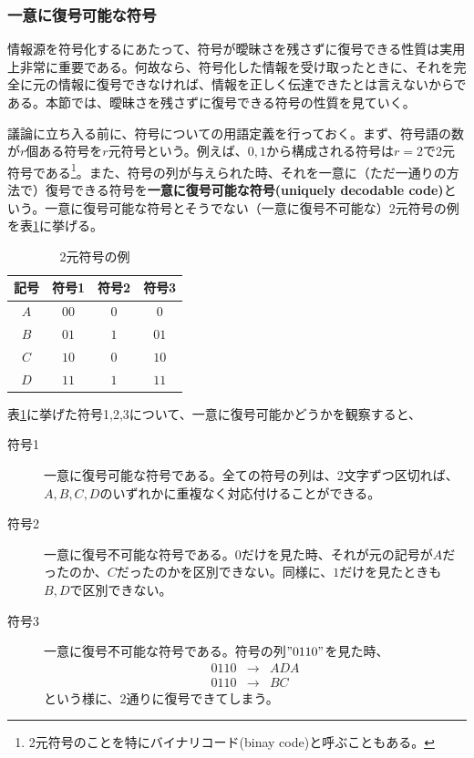 \documentclass[uplatex,dvipdfmx,b5j,10pt]{jsbook}
\theoremstyle{definition}
\begin{document}
\subsubsection{一意に復号可能な符号}

情報源を符号化するにあたって、符号が曖昧さを残さずに復号できる性質は実用上非常に重要である。何故なら、符号化した情報を受け取ったときに、それを完全に元の情報に復号できなければ、情報を正しく伝達できたとは言えないからである。本節では、曖昧さを残さずに復号できる符号の性質を見ていく。

議論に立ち入る前に、符号についての用語定義を行っておく。まず、符号語の数が$r$個ある符号を$r$元符号という。例えば、$0, 1$から構成される符号は$r=2$で2元符号である\footnote{2元符号のことを特にバイナリコード(binay code)と呼ぶこともある。}。また、符号の列が与えられた時、それを一意に（ただ一通りの方法で）復号できる符号を\textbf{一意に復号可能な符号(uniquely decodable code)}という。一意に復号可能な符号とそうでない（一意に復号不可能な）2元符号の例を表\ref{examples_of_binary_code}に挙げる。

\begin{table}[htbp]
  \begin{center}
    \caption{2元符号の例} \label{examples_of_binary_code}
    \begin{tabular}{c|c|c|c}
      記号 & 符号1 & 符号2 & 符号3 \\ \hline
      $A$  & $00$  & $0$   & $0$   \\
      $B$  & $01$  & $1$   & $01$  \\
      $C$  & $10$  & $0$   & $10$  \\
      $D$  & $11$  & $1$   & $11$  \\
    \end{tabular}
  \end{center}
\end{table}

表\ref{examples_of_binary_code}に挙げた符号1,2,3について、一意に復号可能かどうかを観察すると、

\begin{description}
    \item[符号1] 一意に復号可能な符号である。全ての符号の列は、2文字ずつ区切れば、$A, B, C, D$のいずれかに重複なく対応付けることができる。
    \item[符号2] 一意に復号不可能な符号である。$0$だけを見た時、それが元の記号が$A$だったのか、$C$だったのかを区別できない。同様に、$1$だけを見たときも$B, D$で区別できない。
    \item[符号3] 一意に復号不可能な符号である。符号の列$"0110"$を見た時、
      \begin{eqnarray*}
        0110 &\to& ADA \\
        0110 &\to& BC
      \end{eqnarray*}
      という様に、2通りに復号できてしまう。
\end{description}
\end{document}
